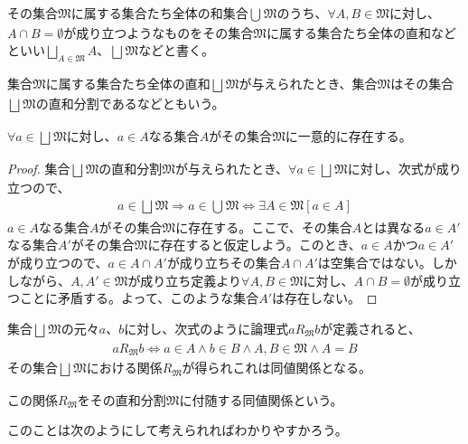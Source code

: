 \documentclass[dvipdfmx]{jsarticle}
\begin{document}
\begin{dfn}
その集合$\mathfrak{M}$に属する集合たち全体の和集合$\bigcup_{} \mathfrak{M}$のうち、$\forall A,B \in \mathfrak{M}$に対し、$A \cap B = \emptyset$が成り立つようなものをその集合$\mathfrak{M}$に属する集合たち全体の直和などといい$\bigsqcup_{A \in \mathfrak{M}} A$、$\bigsqcup_{} \mathfrak{M}$などと書く。
\end{dfn}
\begin{dfn}
集合$\mathfrak{M}$に属する集合たち全体の直和$\bigsqcup_{} \mathfrak{M}$が与えられたとき、集合$\mathfrak{M}$はその集合$\bigsqcup_{} \mathfrak{M}$の直和分割であるなどともいう。
\end{dfn}
\begin{thm}\label{1.2.5.8}
$\forall a \in \bigsqcup_{} \mathfrak{M}$に対し、$a \in A$なる集合$A$がその集合$\mathfrak{M}$に一意的に存在する。
\end{thm}
\begin{proof}
集合$\bigsqcup_{} \mathfrak{M}$の直和分割$\mathfrak{M}$が与えられたとき、$\forall a \in \bigsqcup_{} \mathfrak{M}$に対し、次式が成り立つので、
\begin{align*}
a \in \bigsqcup_{} \mathfrak{M} \Rightarrow a \in \bigcup_{} \mathfrak{M} \Leftrightarrow \exists A \in \mathfrak{M}[ a \in A]
\end{align*}
$a \in A$なる集合$A$がその集合$\mathfrak{M}$に存在する。ここで、その集合$A$とは異なる$a \in A'$なる集合$A'$がその集合$\mathfrak{M}$に存在すると仮定しよう。このとき、$a \in A$かつ$a \in A'$が成り立つので、$a \in A \cap A'$が成り立ちその集合$A \cap A'$は空集合ではない。しかしながら、$A,A'\in \mathfrak{M}$が成り立ち定義より$\forall A,B \in \mathfrak{M}$に対し、$A \cap B = \emptyset$が成り立つことに矛盾する。よって、このような集合$A'$は存在しない。
\end{proof}
\begin{thm}\label{1.2.5.9}
集合$\bigsqcup_{} \mathfrak{M}$の元々$a$、$b$に対し、次式のように論理式$aR_{\mathfrak{M}}b$が定義されると、
\begin{align*}
aR_{\mathfrak{M}}b \Leftrightarrow a \in A \land b \in B \land A,B \in \mathfrak{M \land}A = B
\end{align*}
その集合$\bigsqcup_{} \mathfrak{M}$における関係$R_{\mathfrak{M}}$が得られこれは同値関係となる。
\end{thm}
\begin{dfn}
この関係$R_{\mathfrak{M}}$をその直和分割$\mathfrak{M}$に付随する同値関係という。
\end{dfn}
このことは次のようにして考えられればわかりやすかろう。
\end{document}
